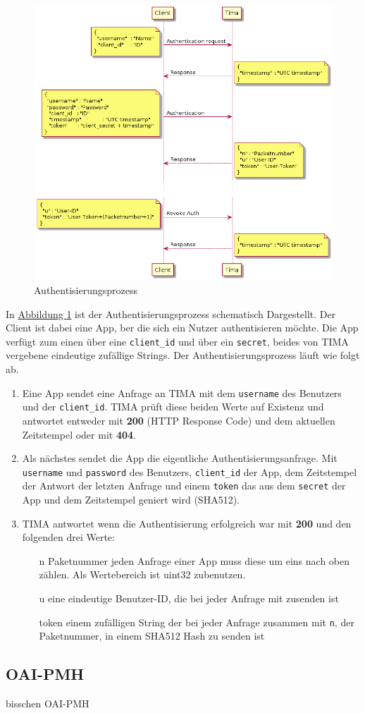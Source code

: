 \begin{figure}
	\centering
	\includegraphics[width=\textwidth]{images/auth.png}
	\caption{Authentisierungsprozess}
	\label{fig:auth}
\end{figure}

In \hyperref[fig:auth]{Abbildung \ref*{fig:auth}} ist der Authentisierungsprozess schematisch Dargestellt. Der Client ist dabei eine App, ber die sich ein Nutzer authentisieren möchte. Die App verfügt zum einen über eine \texttt{client\_id} und über ein \texttt{secret}, beides von TIMA vergebene eindeutige zufällige Strings. Der Authentisierungsprozess läuft wie folgt ab.
\begin{enumerate}
	\item Eine App sendet eine Anfrage an TIMA mit dem \texttt{username} des Benutzers und der \texttt{client\_id}. TIMA prüft diese beiden Werte auf Existenz und antwortet entweder mit \textbf{200} (HTTP Response Code) und dem aktuellen Zeitstempel oder mit \textbf{404}.
	\item Als nächstes sendet die App die eigentliche Authentisierungsanfrage. Mit \texttt{username} und \texttt{password} des Benutzers, \texttt{client\_id} der App, dem Zeitstempel der Antwort der letzten Anfrage und einem \texttt{token} das aus dem \texttt{secret} der App und dem Zeitstempel geniert wird (SHA512).
	\item TIMA antwortet wenn die Authentisierung erfolgreich war mit \textbf{200} und den folgenden drei Werte:
	\begin{itemize}
		\item[n] Paketnummer jeden Anfrage einer App muss diese um eins nach oben zählen. Als Wertebereich ist uint32 zubenutzen.
		\item[u] eine eindeutige Benutzer-ID, die bei jeder Anfrage mit zusenden ist
		\item[token] einem zufälligen String der bei jeder Anfrage zusammen mit \texttt{n}, der Paketnummer, in einem SHA512 Hash zu senden ist
	\end{itemize}
\end{enumerate}

\subsection{OAI-PMH}
bisschen OAI-PMH
